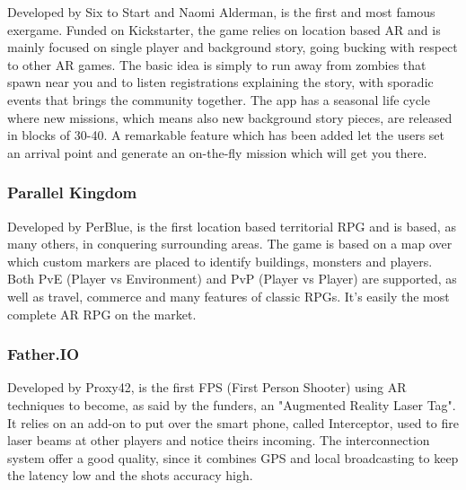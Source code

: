				Developed by Six to Start and Naomi Alderman, is the first and most famous exergame. Funded on Kickstarter, the game relies on location based AR and is mainly focused on single player and background story, going bucking with respect to other AR games.
				The basic idea is simply to run away from zombies that spawn near you and to listen registrations explaining the story, with sporadic events that brings the community together.
				The app has a seasonal life cycle where new missions, which means also new background story pieces, are released in blocks of 30-40.
				A remarkable feature which has been added let the users set an arrival point and generate an on-the-fly mission which will get you there.
			
			\subsubsection{Parallel Kingdom}
			
				Developed by PerBlue, is the first location based territorial RPG and is based, as many others, in conquering surrounding areas.
				The game is based on a map over which custom markers are placed to identify buildings, monsters and players.
				Both PvE (Player vs Environment) and PvP (Player vs Player) are supported, as well as travel, commerce and many features of classic RPGs.
				It's easily the most complete AR RPG on the market.
			
			\subsubsection{Father.IO}
			
				Developed by Proxy42, is the first FPS (First Person Shooter) using AR techniques to become, as said by the funders, an "Augmented Reality Laser Tag".
				It relies on an add-on to put over the smart phone, called Interceptor, used to fire laser beams at other players and notice theirs incoming.
				The interconnection system offer a good quality, since it combines GPS and local broadcasting to keep the latency low and the shots accuracy high.